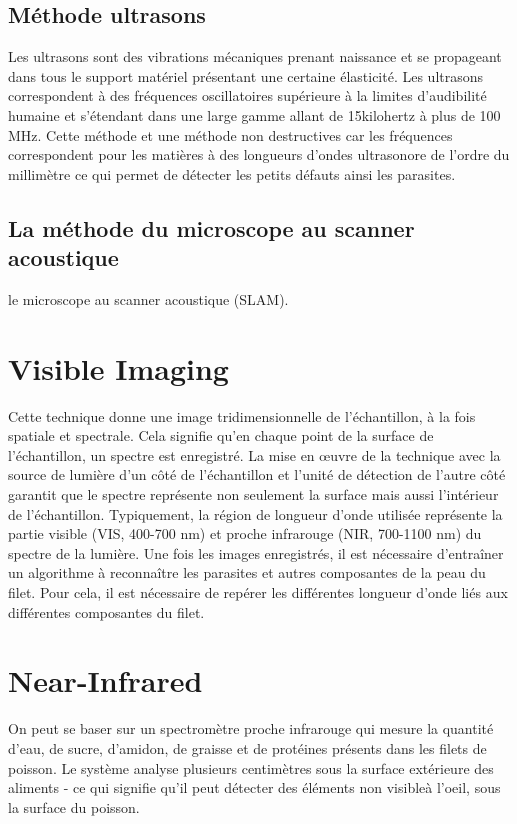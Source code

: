 \documentclass[12pt,a4paper]{article}
\begin{document}
\subsection{Méthode ultrasons}

Les ultrasons sont des vibrations mécaniques prenant naissance et se propageant dans tous le support matériel présentant une certaine élasticité.
Les ultrasons correspondent à des fréquences oscillatoires supérieure à la limites d’audibilité humaine et s’étendant dans une large gamme allant de 15kilohertz à plus de 100 MHz.
Cette méthode et une méthode non destructives car les fréquences correspondent pour les matières à des longueurs d’ondes ultrasonore de l’ordre du millimètre ce qui permet de détecter les petits défauts ainsi les parasites. 



\subsection{La méthode du  microscope au scanner acoustique}
le microscope au scanner acoustique (SLAM).


\section{Visible Imaging}


Cette technique donne une image tridimensionnelle de l'échantillon, à la fois spatiale et spectrale. Cela signifie qu'en chaque point de la surface de l'échantillon, un spectre est enregistré. La mise en œuvre de la technique avec la source de lumière d'un côté de l'échantillon et l'unité de détection de l'autre côté garantit que le spectre représente non seulement la surface mais aussi l'intérieur de l'échantillon.
Typiquement, la région de longueur d'onde utilisée représente la partie visible (VIS, 400-700 nm) et proche infrarouge (NIR, 700-1100 nm) du spectre de la lumière.
Une fois les images enregistrés, il est nécessaire d'entraîner un algorithme à reconnaître les parasites et autres composantes de la peau du filet.
Pour cela, il est nécessaire de repérer les différentes longueur d'onde liés aux différentes composantes du filet.


\section{Near-Infrared}

On peut se baser sur un spectromètre proche infrarouge qui mesure la quantité d'eau, de sucre, d'amidon, de graisse et de protéines présents dans les filets de poisson. Le système analyse plusieurs centimètres sous la surface extérieure des aliments - ce qui signifie qu'il peut détecter des éléments non visibleà l'oeil, sous la surface du poisson.
\end{document}
